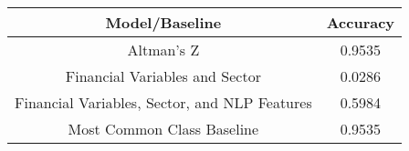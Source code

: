 \footnotesize
\begin{tabular}{cc}
\toprule
Model/Baseline & Accuracy \\
\midrule
Altman's Z & 0.9535 \\
Financial Variables and Sector & 0.0286 \\
Financial Variables, Sector, and NLP Features & 0.5984 \\
Most Common Class Baseline & 0.9535 \\
\bottomrule
\end{tabular}

\normalsize